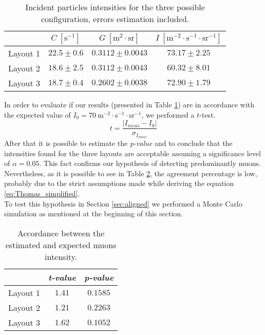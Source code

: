 \begin{table}[!htp]
	\centering
	\begin{tabular}{r|ccc}
		\toprule
		& $C \ \left[ \si{\second}^{-1}\right] $ & $G \ \left[ \si{\meter}^{2}\cdot \si{\steradian}\right] $ & $I \ \left[ \si{\meter}^{-2} \cdot \si{\second}^{-1} \cdot \si{\steradian}^{-1}\right] $\\
		\midrule
		Layout 1 & $22.5\pm0.6$ & $0.3112\pm0.0043$ & $73.17\pm2.25$\\
		Layout 2 & $18.6\pm2.5$ & $0.3112\pm0.0043$ & $60.32\pm8.01$\\ 
		Layout 3 & $18.7\pm0.4$ & $0.2602\pm0.0038$ & $72.90\pm1.79$\\
		\bottomrule
	\end{tabular}
	\caption{Incident particles intensities for the three possible configuration, errors estimation included.}
	\label{tab:Thomas_results}
\end{table}
\indent In order to evaluate if our results (presented in Table \ref{tab:Thomas_results}) are in accordance with the expected value of $I_0 = 70 \ \si{\meter}^{-2} \cdot \si{\second}^{-1} \cdot \si{\steradian}^{-1} $, we performed a $t$-test.
\begin{equation}\label{eq:zTest}
	t = \frac{\left| I_{meas} - I_0\right|}{\sigma_{I_{meas}}} 
\end{equation}
After that it is possible to estimate the \emph{p-value} and to conclude that the intensities found for the three layouts are acceptable assuming a significance level of $\alpha = 0.05$. This fact confirms our hypothesis of detecting predominantly muons. Nevertheless, as it is possible to see in Table \ref{tab:accordance}, the agreement percentage is low, probably due to the strict assumptions made while deriving the equation \eqref{eq:Thomas_simplified}.\\
To test this hypothesis in Section \ref{sec:aligned} we performed a Monte Carlo simulation as mentioned at the beginning of this section.
\begin{table}[!htp]
	\centering
	\begin{tabular}{r|cc}
		\toprule
		& \emph{t-value} & \emph{p-value} \\
		\midrule
		Layout 1 & $1.41$ & $0.1585$ \\
		Layout 2 & $1.21$ & $0.2263$ \\ 
		Layout 3 & $1.62$ & $0.1052$ \\
		\bottomrule
	\end{tabular}
	\caption{Accordance between the estimated and expected muons intensity.}
	\label{tab:accordance}
\end{table}

